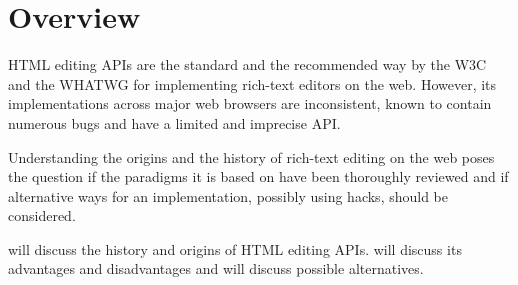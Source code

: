 \chapter{Overview}





HTML editing APIs are the standard and the recommended way by the W3C and the WHATWG for implementing rich-text editors on the web. However, its implementations across major web browsers are inconsistent, known to contain numerous bugs and have a limited and imprecise API.

Understanding the origins and the history of rich-text editing on the web poses the question if the paradigms it is based on have been thoroughly reviewed and if alternative ways for an implementation, possibly using hacks, should be considered.

 will discuss the history and origins of HTML editing APIs.  will discuss its advantages and disadvantages and
 will discuss possible alternatives.






